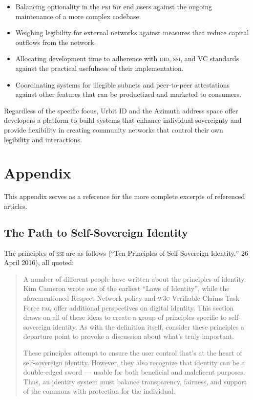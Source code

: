 \documentclass[twoside]{article}
\begin{document}
\begin{itemize}
  \item  Balancing optionality in the \textsc{pki} for end users against the ongoing maintenance of a more complex codebase.
  \item  Weighing legibility for external networks against measures that reduce capital outflows from the network.
  \item  Allocating development time to adherence with \textsc{did}, \textsc{ssi}, and VC standards against the practical usefulness of their implementation.
  \item  Coordinating systems for illegible subnets and peer-to-peer attestations against other features that can be productized and marketed to consumers.
\end{itemize}

Regardless of the specific focus, Urbit ID and the Azimuth address space offer developers a platform to build systems that enhance individual sovereignty and provide flexibility in creating community networks that control their own legibility and interactions.\tombstone{}


\section{Appendix}

This appendix serves as a reference for the more complete excerpts of referenced articles.

\subsection{The Path to Self-Sovereign Identity}

The principles of \textsc{ssi} are as follows (``Ten Principles of Self-Sovereign Identity,'' 26 April 2016), all quoted:

\begin{quote}
  A number of different people have written about the principles of identity. Kim Cameron wrote one of the earliest ``Laws of Identity'', while the aforementioned Respect Network policy and \textsc{w3c} Verifiable Claims Task Force \textsc{faq} offer additional perspectives on digital identity. This section draws on all of these ideas to create a group of principles specific to self-sovereign identity. As with the definition itself, consider these principles a departure point to provoke a discussion about what’s truly important.

  These principles attempt to ensure the user control that’s at the heart of self-sovereign identity. However, they also recognize that identity can be a double-edged sword — usable for both beneficial and maleficent purposes. Thus, an identity system must balance transparency, fairness, and support of the commons with protection for the individual.
\end{quote}
\end{document}
